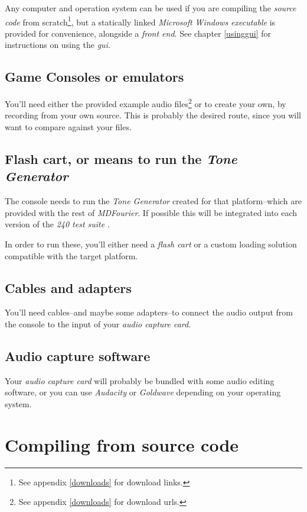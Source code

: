 \documentclass[10pt,a4paper]{report}
\newcommand{\ac}[1]{\textit{\acrshort{#1}}}
\begin{document}
\begin{appendices}
Any computer and operation system can be used if you are compiling the \textit{source code} from scratch\footnote{See appendix \ref{downloads} for download links.}, but a statically linked \textit{Microsoft Windows executable} is provided for convenience, alongside a \textit{front end}. See chapter \ref{usinggui} for instructions on using the \ac{gui}.

\section{Game Consoles or emulators}

You'll need either the provided example audio files\footnote{See appendix \ref{downloads} for download urls.} or to create your own, by recording from your own source. This is probably the desired route, since you will want to compare against your files.

\section{Flash cart, or means to run the \textit{Tone Generator}}

The console needs to run the \textit{Tone Generator} created for that platform--which are provided with the rest of \textit{MDFourier}. If possible this will be integrated into each version of the \textit{240 test suite} \cite{240pSuite}.

In order to run these, you'll either need a \textit{flash cart} or a custom loading solution compatible with the target platform.

\section{Cables and adapters}

You'll need cables--and maybe some adapters--to connect the audio output from the console to the input of your \textit{audio capture card}.

\section{Audio capture software}

Your \textit{audio capture card} will probably be bundled with some audio editing software, or you can use \textit{Audacity} \cite{audacity} or \textit{Goldwave} \cite{goldwave} depending on your operating system.

\chapter{Compiling from source code}


\end{appendices}
\end{document}
